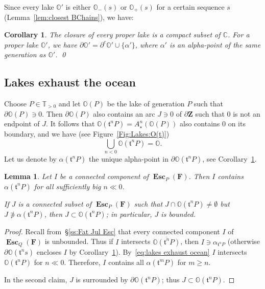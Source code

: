 \documentclass{amsart}
\newcommand{\1}{{\mathbb 1 }}
\newcommand\PT{\mathbb{ T}}
\newcommand{\bO}{{\mathbb{O}}}
\newcommand{\bF}{{\mathbf F}}
\newcommand{\bZ}{{\mathbf Z}}
\newcommand{\str}{{\star}}
\renewcommand{\tt}{\mathfrak{t}}
\newcommand{\C}{\mathbb{C}}
\newtheorem{cor}[thm]{Corollary}
\newtheorem{lem}[thm]{Lemma}
\theoremstyle{remark}
\numberwithin{equation}{section}
\theoremstyle{definition}
\newcommand{\Esc}{{\boldsymbol{\operatorname{Esc}}}}
\theoremstyle{nonumberbreak}
\begin{document}
Since every lake $\bO'$ is either $\bO_-(s)$ or $\bO_+(s)$ for a certain sequence $s$ (Lemma~\ref{lem:closest BChains}), we have:
\begin{cor}
\label{cor:lake:closure is bnd}
The closure of every proper lake is a compact subset of $\C$. For a proper lake $\bO'$, we have $\partial \bO'=\partial^c \bO' \cup \{\alpha'\}$, where $\alpha'$ is an alpha-point of the same generation as $\bO'$.
\qed 
\end{cor}


\subsection{Lakes exhaust the ocean}
Choose $P\in\PT_{>0}$ and let $\bO(P)$ be the lake of generation $P$ such that $\partial \bO(P)\ni 0$. Then $\partial \bO(P)$ also contains an arc $J\ni 0$ of $\partial \bZ$ such that $0$ is not an endpoint of $J$. It follows that $\bO(\tt^n P) =A_\str^{n}(\bO(P))$ also contains $0$ on its boundary, and we have (see Figure~\ref{Fig:Lakes:O(t)})
\begin{equation}
\label{eq:lakes exhaust ocean}
\bigcup_{n<0}\bO(\tt^n P) =\bO. 
\end{equation}
Let us denote by $\alpha(\tt^n P)$ the unique alpha-point in $\partial \bO(\tt^n P)$, see Corollary~\ref{cor:lake:closure is bnd}. 

\begin{lem}
\label{lem:I contains alpha n}
Let $I$ be a connected component of $\Esc_P(\bF)$. Then $I$ contains $\alpha(\tt^{n} P)$ for all sufficiently big $n\ll 0$.

If $J$ is a connected subset of $\Esc_P(\bF)$ such that $J\cap \bO(\tt^nP)\not=\emptyset$ but $J\not\ni \alpha(\tt^n P)$, then $J\subset \bO(\tt^n P)$; in particular, $J$ is bounded.
\end{lem}
\begin{proof}
Recall from~\S\ref{ss:Fat Jul  Esc} that every connected component $I$ of $\Esc_Q(\bF)$ is unbounded. Thus if $I$ intersects $\overline{\bO(\tt^n P) }$, then $I\ni \alpha_{\tt^n P}$ (otherwise $\partial \bO(\tt^n s)$ encloses $I$ by Corollary~\ref{cor:lake:closure is bnd}). By~\eqref{eq:lakes exhaust ocean} $I$ intersects $\bO(\tt^nP)$ for $n\ll 0$. Therefore, $I$ contains all $\alpha(\tt^m P)$ for $m\ge n$. 

In the second claim, $J$ is surrounded by $\partial \bO(\tt^n P)$; thus $J\subset \bO(\tt^n P)$.
\end{proof}
\end{document}
